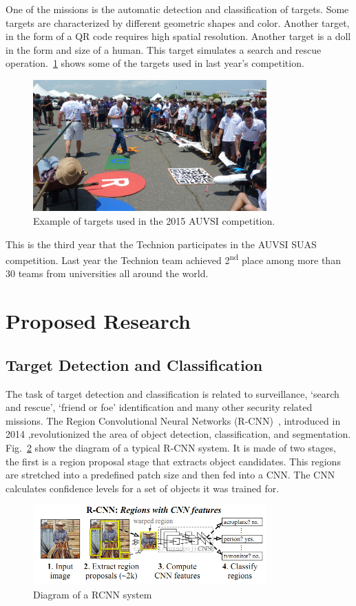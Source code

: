 \documentclass{article} %
\begin{document}
One of the missions is the automatic detection and classification of targets.
Some targets are characterized by different geometric shapes and color. Another
target, in the form of a QR code requires high spatial resolution. Another
target is a doll in the form and size of a human. This target simulates
a search and rescue operation.~\cref{fig:targets} shows
some of the targets used in last year's competition.
\begin{figure}[h]
	\centering
	\includegraphics[width=0.8\textwidth]{auvsi_targets}
	\caption{Example of targets used in the 2015 AUVSI competition.}
	\label{fig:targets}
\end{figure}

This is the third year that the Technion participates in the AUVSI SUAS
competition. Last year the Technion team achieved 2\textsuperscript{nd} place
among more than 30 teams from universities all around the world.

\section{Proposed Research}

\subsection{Target Detection and Classification}

The task of target detection and classification is related
to surveillance, `search and rescue', `friend or foe' identification and many other security related missions. 
The Region Convolutional Neural Networks
(R-CNN)~\cite{Girshick2014}, introduced in 2014 ,revolutionized the area of object detection, classification, and segmentation.
Fig.~\ref{fig:RCNN} show the diagram of a typical
R-CNN system. It is made of two stages, the first is a region proposal stage that extracts
object candidates. This regions are stretched into a predefined patch size and then
fed into a CNN. The CNN calculates confidence levels for a set of objects it was trained
for.
\begin{figure}[h]
	\centering
	\includegraphics[width=0.8\textwidth]{RCNN}
	\caption{Diagram of a RCNN system}
	\label{fig:RCNN}
\end{figure}
\end{document}
